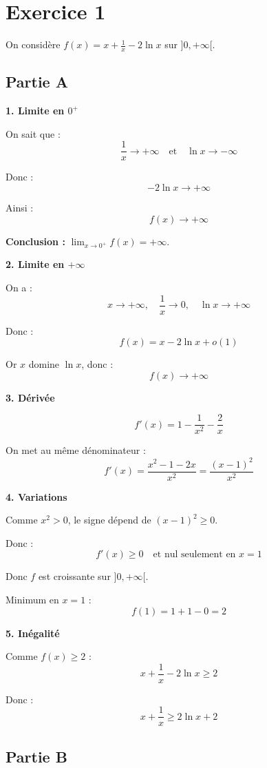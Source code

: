 \documentclass[11pt,a4paper]{article}
\begin{document}
\section*{Exercice 1}

On considère $f(x)=x+\frac{1}{x}-2\ln x$ sur $]0,+\infty[$.

\subsection*{Partie A}

\textbf{1. Limite en $0^+$}

On sait que :
\[
\frac{1}{x}\to +\infty \quad \text{et} \quad \ln x \to -\infty
\]

Donc :
\[
-2\ln x \to +\infty
\]

Ainsi :
\[
f(x)\to +\infty
\]

\textbf{Conclusion :} $\lim_{x\to0^+} f(x)=+\infty$.

\bigskip

\textbf{2. Limite en $+\infty$}

On a :
\[
x\to+\infty,\quad \frac{1}{x}\to0,\quad \ln x\to+\infty
\]

Donc :
\[
f(x)=x-2\ln x + o(1)
\]

Or $x$ domine $\ln x$, donc :
\[
f(x)\to +\infty
\]

\bigskip

\textbf{3. Dérivée}

\[
f'(x)=1-\frac{1}{x^2}-\frac{2}{x}
\]

On met au même dénominateur :
\[
f'(x)=\frac{x^2 -1 -2x}{x^2} = \frac{(x-1)^2}{x^2}
\]

\bigskip

\textbf{4. Variations}

Comme $x^2>0$, le signe dépend de $(x-1)^2\ge0$.

Donc :
\[
f'(x)\ge0 \quad \text{et nul seulement en } x=1
\]

Donc $f$ est croissante sur $]0,+\infty[$.

Minimum en $x=1$ :
\[
f(1)=1+1-0=2
\]

\bigskip

\textbf{5. Inégalité}

Comme $f(x)\ge2$ :
\[
x+\frac{1}{x}-2\ln x \ge 2
\]

Donc :
\[
x+\frac{1}{x} \ge 2\ln x +2
\]

\bigskip

\subsection*{Partie B}
\end{document}

